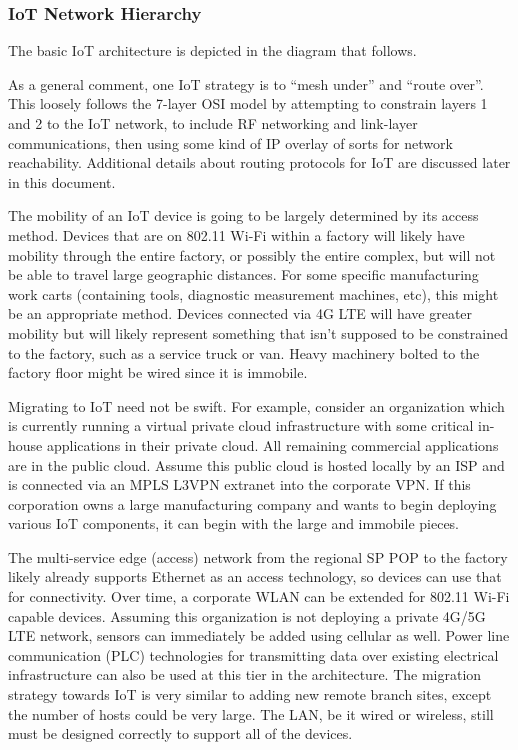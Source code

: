 \subsubsection{IoT Network Hierarchy}
The basic IoT architecture is depicted in the diagram that follows.


As a general comment, one IoT strategy is to ``mesh under'' and ``route
over''. This loosely follows the 7-layer OSI model by attempting to constrain
layers 1 and 2 to the IoT network, to include RF networking and link-layer
communications, then using some kind of IP overlay of sorts for network
reachability. Additional details about routing protocols for IoT are discussed
later in this document.

The mobility of an IoT device is going to be largely determined by its access
method. Devices that are on 802.11 Wi-Fi within a factory will likely have
mobility through the entire factory, or possibly the entire complex, but will
not be able to travel large geographic distances. For some specific
manufacturing work carts (containing tools, diagnostic measurement machines,
etc), this might be an appropriate method. Devices connected via 4G LTE will
have greater mobility but will likely represent something that isn’t supposed
to be constrained to the factory, such as a service truck or van. Heavy
machinery bolted to the factory floor might be wired since it is immobile.

Migrating to IoT need not be swift. For example, consider an organization
which is currently running a virtual private cloud infrastructure with some
critical in-house applications in their private cloud. All remaining
commercial applications are in the public cloud. Assume this public cloud is
hosted locally by an ISP and is connected via an MPLS L3VPN extranet into the
corporate VPN\@. If this corporation owns a large manufacturing company and
wants to begin deploying various IoT components, it can begin with the large
and immobile pieces.

The multi-service edge (access) network from the regional SP POP to the
factory likely already supports Ethernet as an access technology, so devices
can use that for connectivity. Over time, a corporate WLAN can be extended for
802.11 Wi-Fi capable devices. Assuming this organization is not deploying a
private 4G/5G LTE network, sensors can immediately be added using cellular as
well. Power line communication (PLC) technologies for transmitting data over
existing electrical infrastructure can also be used at this tier in the
architecture. The migration strategy towards IoT is very similar to adding new
remote branch sites, except the number of hosts could be very large. The LAN,
be it wired or wireless, still must be designed correctly to support all of
the devices.

